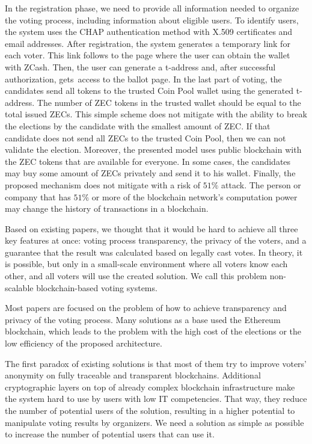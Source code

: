 \documentclass[applsci,article,accept,moreauthors,pdftex]{Definitions/mdpi}
\begin{document}
In the registration phase, we need to provide all information needed to organize the voting process, including information about eligible users. To identify users, the system uses the CHAP authentication method with X.509 certificates and email addresses. After registration, the system generates a temporary link for each voter. This link follows to the page where the user can obtain the wallet with ZCash. Then, the user can generate a t-address and, after successful authorization, gets~access to the ballot page. In the last part of voting, the candidates send all tokens to the trusted Coin Pool wallet using the generated t-address. The number of ZEC tokens in the trusted wallet should be equal to the total issued ZECs. This simple scheme does not mitigate with the ability to break the elections by the candidate with the smallest amount of ZEC. If that candidate does not send all ZECs to the trusted Coin Pool, then we can not validate the election. Moreover, the presented model uses public blockchain with the ZEC tokens that are available for everyone. In some cases, the candidates may buy some amount of ZECs privately and send it to his wallet. Finally, the proposed mechanism does not mitigate with a risk of $51\%$ attack. The person or company that has $51\%$ or more of the blockchain network's computation power may change the history of transactions in a blockchain.

Based on existing papers, we thought that it would be hard to achieve all three key features at once: voting process transparency, the privacy of the voters, and a guarantee that the result was calculated based on legally cast votes. In theory, it is possible, but only in a small-scale environment where all voters know each other, and all voters will use the created solution. We call this problem non-scalable blockchain-based voting systems. 

Most papers are focused on the problem of how to achieve transparency and privacy of the voting process. Many solutions as a base used the Ethereum blockchain, which leads to the problem with the high cost of the elections or the low efficiency of the proposed architecture. 

The first paradox of existing solutions is that most of them try to improve voters' anonymity on fully traceable and transparent blockchains. Additional cryptographic layers on top of already complex blockchain infrastructure make the system hard to use by users with low IT competencies. That way, they reduce the number of potential users of the solution, resulting in a higher potential to manipulate voting results by organizers. We need a solution as simple as possible to increase the number of potential users that can use it.
\end{document}

